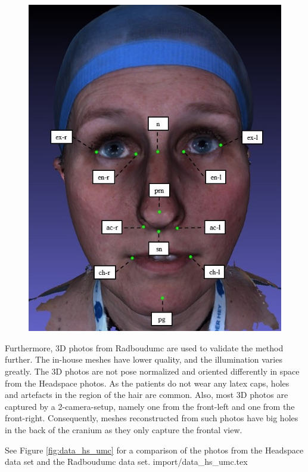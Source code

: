 \documentclass[class=article, crop=false]{standalone}
\begin{document}
\begin{figure}[htb]
\centering
  \includegraphics[width=0.9\linewidth]{thesis/introduction/imgs/landmarks.jpg}
  \label{fig:landmarks}
\end{figure}

Furthermore, 3D photos from Radboudumc are used to validate the method further. The in-house meshes have lower quality, and the illumination varies greatly. The 3D photos are not pose normalized and oriented differently in space from the Headspace photos. As the patients do not wear any latex caps, holes and artefacts in the region of the hair are common. Also, most 3D photos are captured by a 2-camera-setup, namely one from the front-left and one from the front-right. Consequently, meshes reconstructed from such photos have big holes in the back of the cranium as they only capture the frontal view.

See Figure \ref{fig:data_hs_umc} for a comparison of the photos from the Headspace data set and the Radboudumc data set.
{import/data_hs_umc.tex}
\end{document}
